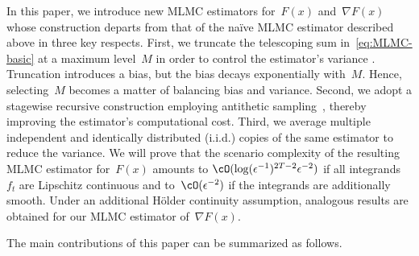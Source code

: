 \documentclass[11pt]{article}
\begin{document}
In this paper, we introduce new MLMC estimators for~$F(x)$ and~$\nabla F(x)$ whose construction departs from that of the na\"ive MLMC estimator described above in three key respects. First, we truncate the telescoping sum in~\eqref{eq:MLMC-basic} at a maximum level~$M$ in order to control the estimator's variance \cite{blanchet2017unbiased}. Truncation introduces a bias, but the bias decays exponentially with~$M$. Hence, selecting~$M$ becomes a matter of balancing bias and variance. Second, we adopt a stagewise recursive construction employing antithetic sampling~\cite{giles2014antithetic}, thereby improving the estimator's computational cost. Third, we average multiple independent and identically distributed (i.i.d.) copies of the same estimator to reduce the variance. We will prove that the scenario complexity of the resulting MLMC estimator for~$F(x)$ amounts to $\cO(\log(\epsilon^{-1})^{2T-2}\epsilon^{-2})$ if all integrands~$f_t$ are Lipschitz continuous and to~$\cO(\epsilon^{-2})$ if the integrands are additionally smooth. Under an additional Hölder continuity assumption, analogous results are obtained for our MLMC estimator of~$\nabla F(x)$.



The main contributions of this paper can be summarized as follows.
\end{document}
